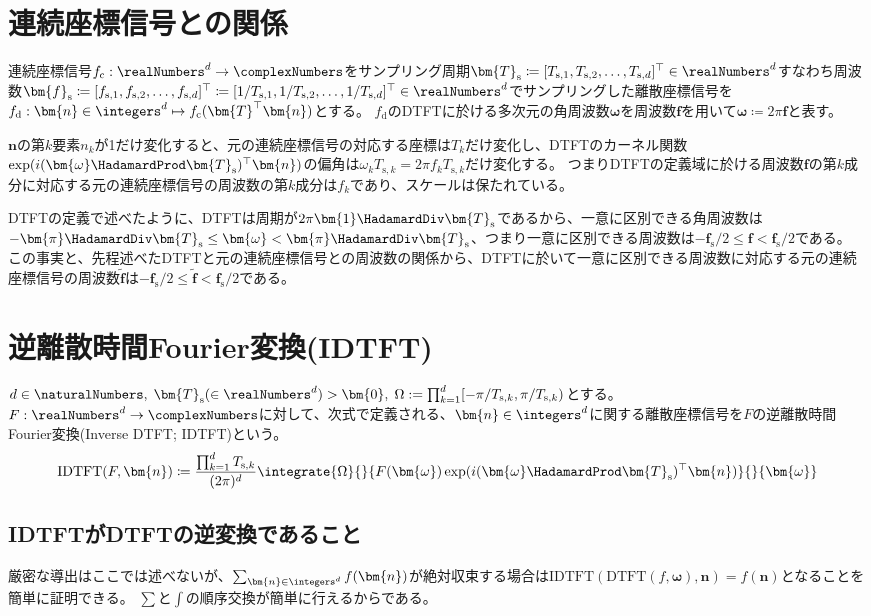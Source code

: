 			\section{連続座標信号との関係}
				連続座標信号$f_\text{c}:\realNumbers^d\to\complexNumbers$をサンプリング周期$\bm{T}_\text{s} \coloneqq [T_{\text{s},1}, T_{\text{s},2}, \dotsc, T_{\text{s},d}]^\top\in\realNumbers^d$すなわち周波数$\bm{f}_\text{s} \coloneqq [f_{\text{s},1}, f_{\text{s},2}, \dotsc, f_{\text{s},d}]^\top \coloneqq [1/T_{\text{s},1}, 1/T_{\text{s},2}, \dotsc, 1/T_{\text{s},d}]^\top\in\realNumbers^d$でサンプリングした離散座標信号を$f_\text{d}: \bm{n}\in\integers^d\mapsto f_\text{c}(\bm{T}^\top\bm{n})$とする。
				$f_\text{d}$のDTFTに於ける多次元の角周波数$\bm{\omega}$を周波数$\bm{f}$を用いて$\bm{\omega} \coloneqq 2\pi\bm{f}$と表す。
				\par
				$\bm{n}$の第$k$要素$n_k$が1だけ変化すると、元の連続座標信号の対応する座標は$T_k$だけ変化し、DTFTのカーネル関数$\exp(i(\bm{\omega}\HadamardProd\bm{T}_\text{s})^\top\bm{n})$の偏角は$\omega_k T_{\text{s},k} = 2\pi f_k T_{\text{s},k}$だけ変化する。
				つまりDTFTの定義域に於ける周波数$\bm{f}$の第$k$成分に対応する元の連続座標信号の周波数の第$k$成分は$f_k$であり、スケールは保たれている。
				\par
				DTFTの定義で述べたように、DTFTは周期が$2\pi\bm{1}\HadamardDiv\bm{T}_\text{s}$であるから、一意に区別できる角周波数は$-\bm{\pi}\HadamardDiv\bm{T}_\text{s} \leq \bm{\omega} < \bm{\pi}\HadamardDiv\bm{T}_\text{s}$、つまり一意に区別できる周波数は$-\bm{f}_\text{s}/2 \leq \bm{f} < \bm{f}_\text{s}/2$である。
				この事実と、先程述べたDTFTと元の連続座標信号との周波数の関係から、DTFTに於いて一意に区別できる周波数に対応する元の連続座標信号の周波数$\tilde{\bm{f}}$は$-\bm{f}_\text{s}/2 \leq \tilde{\bm{f}} < \bm{f}_\text{s}/2$である。
			\section{逆離散時間Fourier変換(IDTFT)}
				$d\in\naturalNumbers,\;\bm{T}_\text{s}(\in\realNumbers^d)>\bm{0},\;\Omega := \prod_{k=1}^d [-\pi/T_{\text{s},k},\pi/T_{\text{s},k})$とする。
				$F:\realNumbers^d\to\complexNumbers$に対して、次式で定義される、$\bm{n}\in\integers^d$に関する離散座標信号を$F$の逆離散時間Fourier変換(Inverse DTFT; IDTFT)という。
				\[ \text{IDTFT}(F,\bm{n}) \coloneqq \frac{\prod_{k=1}^d T_{\text{s},k}}{(2\pi)^d}\integrate{\Omega}{}{F(\bm{\omega})\exp(i(\bm{\omega}\HadamardProd\bm{T}_\text{s})^\top\bm{n})}{}{\bm{\omega}} \]
				\subsection{IDTFTがDTFTの逆変換であること}
					厳密な導出はここでは述べないが、$\sum_{\bm{n}\in\integers^d} f(\bm{n})$が絶対収束する場合は$\text{IDTFT}(\text{DTFT}(f,\bm{\omega}),\bm{n}) = f(\bm{n})$となることを簡単に証明できる。
					$\sum$と$\int$の順序交換が簡単に行えるからである。
